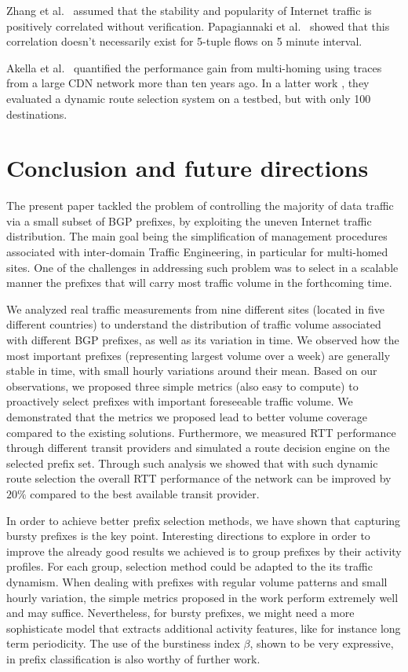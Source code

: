 \documentclass[10pt, conference,letterpaper]{IEEEtran}
\begin{document}
Zhang et al.\ \cite{Zhang2012} assumed that the stability and popularity of Internet traffic is positively correlated without verification. 
Papagiannaki et al.\ \cite{Papagiannaki2004} showed that this correlation doesn't necessarily exist for 5-tuple flows on 5 minute interval. 




Akella et al.\ \cite{Akella2003a} quantified the performance gain from multi-homing using traces from a large CDN network more than ten years ago. 
In a latter work \cite{Akella2008}, they evaluated a dynamic route selection system on a testbed, but with only 100 destinations. 




\section{Conclusion and future directions}
\label{sec:fut}
The present paper tackled the problem of controlling the majority of data traffic via 
a small subset of BGP prefixes, by exploiting the uneven Internet traffic distribution. 
The main goal being the simplification of management procedures associated with inter-domain Traffic Engineering, in particular for multi-homed sites.  
One of the challenges in addressing such problem was to select in a scalable manner the prefixes that will carry most traffic volume in the forthcoming time.  


We analyzed real traffic measurements from nine different sites (located in five different countries) to understand the distribution of traffic volume associated with different BGP prefixes, as well as its variation in time.   
We observed how the most important prefixes (representing largest volume over a week) are generally stable in time, with small hourly variations around their mean. 
Based on our observations, we proposed three simple 
metrics (also easy to compute) to proactively select prefixes with important foreseeable traffic volume.
We demonstrated that the metrics we proposed lead to better volume coverage compared to the existing solutions.
Furthermore, we measured RTT performance through different transit providers and simulated a route decision engine on the selected prefix set. 
Through such analysis we showed that  with such dynamic route selection the overall RTT performance of the network can be improved by $20\%$ compared to the best available transit provider. 

In order to achieve better prefix selection methods, we have shown that capturing bursty prefixes is the key point. 
Interesting directions to explore in order to improve the already good results we achieved is to group prefixes by their activity profiles. 
For each group, selection method could be adapted to the its traffic dynamism.
When dealing with prefixes with regular volume patterns and small hourly variation, the simple metrics proposed in the work perform extremely well and may suffice. 
Nevertheless, for bursty prefixes, we might need a more sophisticate model that extracts additional activity features, like for instance long term periodicity.
The use of the burstiness index $\beta$, shown to be very expressive, in prefix classification is also worthy of further work.



\end{document}
